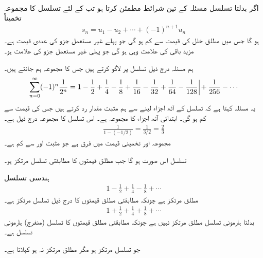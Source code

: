 \\
اگر بدلتا تسلسل  مسئلہ  کے تین شرائط مطمئن کرتا ہو تب  کے لئے  تسلسل کا مجموعہ  تخمیناً
\begin{align*}
s_n=u_1-u_2+\cdots+(-1)^{n+1}u_n
\end{align*}
ہو گا جس میں مطلق خلل کی قیمت  سے کم ہو گی جو پہلے غیر مستعمل جزو کی عددی قیمت ہے۔ مزید باقی  کی علامت وہی ہو گی جو پہلی غیر مستعمل جزو کی علامت ہو۔ 

ہم مسئلہ  درج ذیل تسلسل پر لاگو کرتے ہیں جس کا مجموعہ ہم جانتے ہیں۔
\begin{align*}
\sum_{n=0}^{\infty}(-1)^n\frac{1}{2^n}=1-\frac{1}{2}+\frac{1}{4}-\frac{1}{8}+\frac{1}{16}-\frac{1}{32}+\frac{1}{64}-\frac{1}{128}\,\protect\rule[-2ex]{0.1ex}{5ex}+\frac{1}{256}-\cdots
\end{align*}
یہ مسئلہ کہتا ہے کہ تسلسل کے آٹھ اجزاء لینے سے ہم  مثبت مقدار رد کرتے ہیں جس کی قیمت  سے کم ہو گی۔ ابتدائی آٹھ اجزاء کا مجموعہ  ہے۔ اس تسلسل کا مجموعہ درج ذیل ہے۔
\begin{align*}
\frac{1}{1-(-1/2)}=\frac{1}{3/2}=\frac{2}{3}
\end{align*}
مجموعہ اور تخمینی قیمت میں فرق  ہے جو مثبت اور  سے کم ہے۔

تسلسل  اس صورت  ہو گا جب مطلق قیمتوں کا مطابقتی تسلسل  مرتکز ہو۔

ہندسی تسلسل
\begin{align*}
1-\frac{1}{2}+\frac{1}{4}-\frac{1}{8}+\cdots
\end{align*}
مطلق مرتکز ہے چونکہ مطابقتی مطلق قیمتوں کا درج ذیل تسلسل مرتکز ہے۔
\begin{align*}
1+\frac{1}{2}+\frac{1}{4}+\frac{1}{8}+\cdots
\end{align*}
بدلتا ہارمونی تسلسل مطلق مرتکز نہیں ہے چونکہ مطابقتی مطلق قیمتوں کا تسلسل (منفرج) ہارمونی تسلسل ہے۔

جو تسلسل مرتکز ہو مگر مطلق مرتکز نہ ہو  کہلاتا ہے۔

